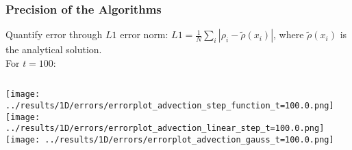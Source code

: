 \begin{frame}
	\frametitle{Precision of the Algorithms}
	Quantify error through $L1$ error norm: $L1 = \frac{1}{N} \sum\limits_i |\rho_i - \tilde{\rho}(x_i)|$, where $\tilde{\rho}(x_i)$ is the analytical solution.\\[2em]
	
	For $t = 100$:\\\vfill
	
	\begin{columns}
			\texttt{[image: ../results/1D/errors/errorplot\_advection\_step\_function\_t=100.0.png]}
			\texttt{[image: ../results/1D/errors/errorplot\_advection\_linear\_step\_t=100.0.png]}
			\texttt{[image: ../results/1D/errors/errorplot\_advection\_gauss\_t=100.0.png]}	
	\end{columns}
	
\end{frame}